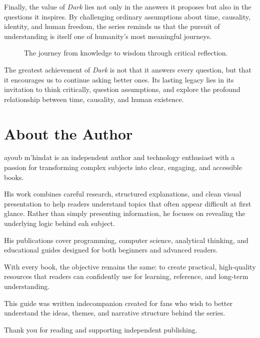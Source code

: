 \documentclass[12pt,oneside,openany]{book}
\begin{document}
Finally, the value of \textit{Dark} lies not only in the answers it proposes
but also in the questions it inspires. By challenging ordinary assumptions
about time, causality, identity, and human freedom, the series reminds us that
the pursuit of understanding is itself one of humanity's most meaningful
journeys.

\begin{figure}[H]
\centering
{}

\caption{The journey from knowledge to wisdom through critical reflection.}
\end{figure}

\begin{tcolorbox}[colback=blue!7,colframe=blue!70!black,title=Final Message]
The greatest achievement of \textit{Dark} is not that it answers every
question, but that it encourages us to continue asking better ones. Its lasting
legacy lies in its invitation to think critically, question assumptions, and
explore the profound relationship between time, causality, and human
existence.
\end{tcolorbox}






\chapter*{About the Author}
ayoub m'hindat is an independent author and technology enthusiast with a passion for transforming complex subjects into clear, engaging, and accessible books.

His work combines careful research, structured explanations, and clean visual presentation to help readers understand topics that often appear difficult at first glance. Rather than simply presenting information, he focuses on revealing the underlying logic behind eah subject.

His publications cover programming, computer science, analytical thinking, and educational guides designed for both beginners and advanced readers.

With every book, the objective remains the same: to create practical, high-quality resources that readers can confidently use for learning, reference, and long-term understanding.

This guide was written indecompanion created for fans who wish to better understand the ideas, themes, and narrative structure behind the series.

Thank you for reading and supporting independent publishing.
\end{document}

